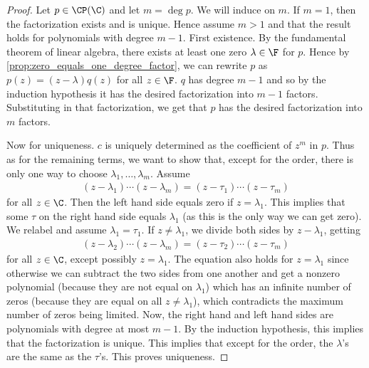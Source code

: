 \documentclass{article}
\begin{document}
\begin{proof}
  Let $p \in \CP(\C)$ and let $m = \deg{p}$. We will induce on $m$. If $m = 1$, then the factorization exists and is unique. Hence assume $m > 1$ and that the result holds for polynomials
  with degree $m - 1$. First existence. By the fundamental theorem of linear algebra, there exists at least one zero $\lambda \in \F$ for $p$. Hence by
  \eqref{prop:zero_equals_one_degree_factor}, we can rewrite $p$ as $p(z) = (z - \lambda)q(z)$ for all $z \in \F$. $q$ has degree $m - 1$ and so by the induction hypothesis it has the
  desired factorization into $m - 1$ factors. Substituting in that factorization, we get that $p$ has the desired factorization into $m$ factors. 

  Now for uniqueness. $c$ is uniquely determined as the coefficient of $z^m$ in $p$. Thus as for the remaining terms, we want to show that, except for the order, there is only one way to
  choose $\lambda_1, \dots, \lambda_m$. Assume
  \begin{align*}
    (z - \lambda_1)\cdots(z - \lambda_m) = (z - \tau_1)\cdots(z - \tau_m)
  \end{align*}
  for all $z \in \C$. Then the left hand side equals zero if $z = \lambda_1$. This implies that some $\tau$ on the right hand side equals $\lambda_1$ (as this is the only way we can get
  zero). We relabel and assume $\lambda_1 = \tau_1$. If $z \neq \lambda_1$, we divide both sides by $z - \lambda_1$, getting
  \begin{align*}
    (z - \lambda_2)\cdots(z - \lambda_m) = (z - \tau_2)\cdots(z - \tau_m)
  \end{align*}
  for all $z \in \C$, except possibly $z = \lambda_1$. The equation also holds for $z = \lambda_1$ since otherwise we can subtract the two sides from one another and get a nonzero polynomial
  (because they are not equal on $\lambda_1$) which has an infinite number of zeros (because they are equal on all $z \neq \lambda_1$), which contradicts the maximum number of zeros being
  limited. Now, the right hand and left hand sides are polynomials with degree at most $m - 1$. By the induction hypothesis, this implies that the factorization is unique. This implies that
  except for the order, the $\lambda$'s are the same as the $\tau$'s. This proves uniqueness.
\end{proof}
\end{document}
